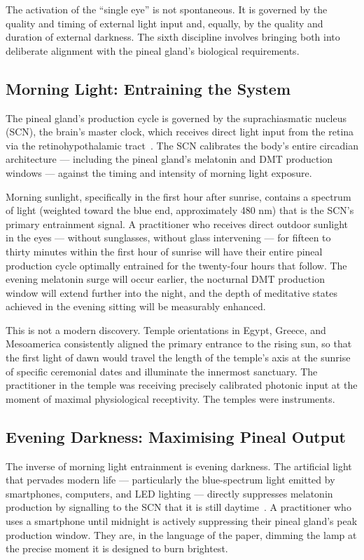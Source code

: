 \documentclass[12pt, a4paper]{article}
\begin{document}
The activation of the ``single eye'' is not spontaneous. It is governed by
the quality and timing of external light input and, equally, by the quality
and duration of external darkness. The sixth discipline involves bringing both
into deliberate alignment with the pineal gland's biological requirements.

\subsection{Morning Light: Entraining the System}

The pineal gland's production cycle is governed by the suprachiasmatic nucleus
(SCN), the brain's master clock, which receives direct light input from the
retina via the retinohypothalamic tract~\autocite{acosta2017}. The SCN
calibrates the body's entire circadian architecture — including the pineal
gland's melatonin and DMT production windows — against the timing and
intensity of morning light exposure.

Morning sunlight, specifically in the first hour after sunrise, contains a
spectrum of light (weighted toward the blue end, approximately 480 nm) that is
the SCN's primary entrainment signal. A practitioner who receives direct
outdoor sunlight in the eyes — without sunglasses, without glass intervening
— for fifteen to thirty minutes within the first hour of sunrise will have
their entire pineal production cycle optimally entrained for the twenty-four
hours that follow. The evening melatonin surge will occur earlier, the
nocturnal DMT production window will extend further into the night, and the
depth of meditative states achieved in the evening sitting will be measurably
enhanced.

This is not a modern discovery. Temple orientations in Egypt, Greece, and
Mesoamerica consistently aligned the primary entrance to the rising sun, so
that the first light of dawn would travel the length of the temple's axis at
the sunrise of specific ceremonial dates and illuminate the innermost sanctuary.
The practitioner in the temple was receiving precisely calibrated photonic
input at the moment of maximal physiological receptivity. The temples were
instruments.

\subsection{Evening Darkness: Maximising Pineal Output}

The inverse of morning light entrainment is evening darkness. The artificial
light that pervades modern life — particularly the blue-spectrum light emitted
by smartphones, computers, and LED lighting — directly suppresses melatonin
production by signalling to the SCN that it is still daytime~\autocite{acosta2017}.
A practitioner who uses a smartphone until midnight is actively suppressing
their pineal gland's peak production window. They are, in the language of the
paper, dimming the lamp at the precise moment it is designed to burn brightest.
\end{document}
